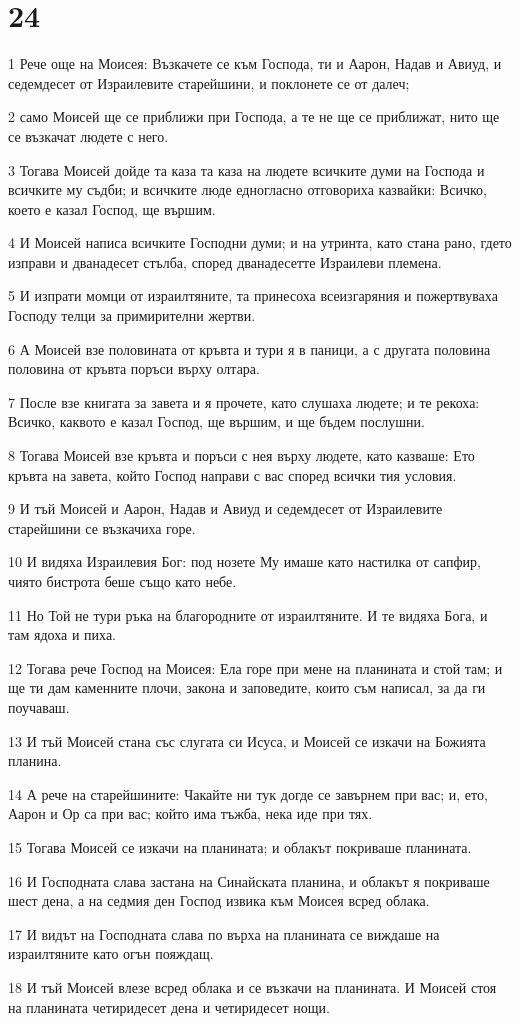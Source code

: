 \chapter{24}

\par 1 Рече още на Моисея: Възкачете се към Господа, ти и Аарон, Надав и Авиуд, и седемдесет от Израилевите старейшини, и поклонете се от далеч;
\par 2 само Моисей ще се приближи при Господа, а те не ще се приближат, нито ще се възкачат людете с него.
\par 3 Тогава Моисей дойде та каза та каза на людете всичките думи на Господа и всичките му съдби; и всичките люде едногласно отговориха казвайки: Всичко, което е казал Господ, ще вършим.
\par 4 И Моисей написа всичките Господни думи; и на утринта, като стана рано, гдето изправи и дванадесет стълба, според дванадесетте Израилеви племена.
\par 5 И изпрати момци от израилтяните, та принесоха всеизгаряния и пожертвуваха Господу телци за примирителни жертви.
\par 6 А Моисей взе половината от кръвта и тури я в паници, а с другата половина половина от кръвта поръси върху олтара.
\par 7 После взе книгата за завета и я прочете, като слушаха людете; и те рекоха: Всичко, каквото е казал Господ, ще вършим, и ще бъдем послушни.
\par 8 Тогава Моисей взе кръвта и поръси с нея върху людете, като казваше: Ето кръвта на завета, който Господ направи с вас според всички тия условия.
\par 9 И тъй Моисей и Аарон, Надав и Авиуд и седемдесет от Израилевите старейшини се възкачиха горе.
\par 10 И видяха Израилевия Бог: под нозете Му имаше като настилка от сапфир, чиято бистрота беше също като небе.
\par 11 Но Той не тури ръка на благородните от израилтяните. И те видяха Бога, и там ядоха и пиха.
\par 12 Тогава рече Господ на Моисея: Ела горе при мене на планината и стой там; и ще ти дам каменните плочи, закона и заповедите, които съм написал, за да ги поучаваш.
\par 13 И тъй Моисей стана със слугата си Исуса, и Моисей се изкачи на Божията планина.
\par 14 А рече на старейшините: Чакайте ни тук догде се завърнем при вас; и, ето, Аарон и Ор са при вас; който има тъжба, нека иде при тях.
\par 15 Тогава Моисей се изкачи на планината; и облакът покриваше планината.
\par 16 И Господната слава застана на Синайската планина, и облакът я покриваше шест дена, а на седмия ден Господ извика към Моисея всред облака.
\par 17 И видът на Господната слава по върха на планината се виждаше на израилтяните като огън пояждащ.
\par 18 И тъй Моисей влезе всред облака и се възкачи на планината. И Моисей стоя на планината четиридесет дена и четиридесет нощи.

